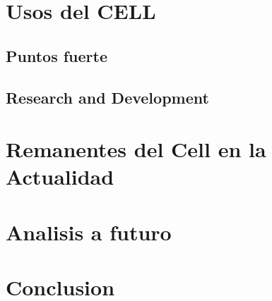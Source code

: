 \documentclass[11pt,compsoc]{IEEEtran}
\begin{document}
	
	
	\section{Usos del CELL}
	\noindent
	
	\subsection{Puntos fuerte}
	\noindent
	
	\subsection{Research and Development}
	\noindent
	
	
	
	\section{Remanentes del Cell en la Actualidad}
	\noindent 
	
	
	
	
	
	
	
	\section{Analisis a futuro}
	\noindent 
	
	
	
	
	
	
	\section{Conclusion}
	\noindent
	
\end{document}
